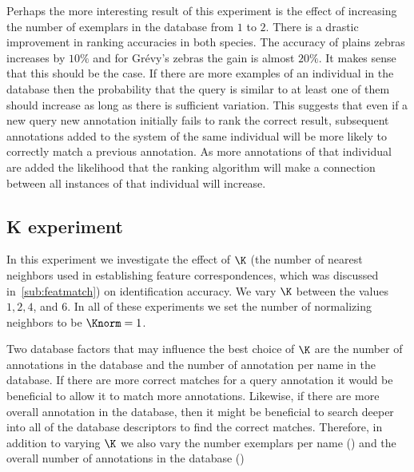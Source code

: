         Perhaps the more interesting result of this experiment is the effect of increasing the number of
          exemplars in the database from $1$ to $2$.
        There is a drastic improvement in ranking accuracies in both species.
        The accuracy of plains zebras increases by $10\percent$ and for Grévy's zebras the gain is almost
          $20\percent$.
        It makes sense that this should be the case.
        If there are more examples of an individual in the database then the probability that the query is
          similar to at least one of them should increase as long as there is sufficient variation.
        This suggests that even if a new query new annotation initially fails to rank the correct result,
          subsequent annotations added to the system of the same individual will be more likely to correctly match
          a previous annotation.
        As more annotations of that individual are added the likelihood that the ranking algorithm will make a
          connection between all instances of that individual will increase.

        \NScoreExpt{}


    \FloatBarrier{}
    \subsection{K experiment}\label{sub:exptk}  

        In this experiment we investigate the effect of $\K$ (the number of nearest neighbors used in
          establishing feature correspondences, which was discussed in~\cref{sub:featmatch}) on identification
          accuracy.
        We vary $\K$ between the values $1, 2, 4$, and $6$.
        In all of these experiments we set the number of normalizing neighbors to be $\Knorm=1$.

        Two database factors that may influence the best choice of $\K$ are the number of annotations in the
          database and the number of annotation per name in the database.
        If there are more correct matches for a query annotation it would be beneficial to allow it to match more
          annotations.
        Likewise, if there are more overall annotation in the database, then it might be beneficial to search
          deeper into all of the database descriptors to find the correct matches.
        Therefore, in addition to varying $\K$ we also vary the number exemplars per name () and
          the overall number of annotations in the database ()

